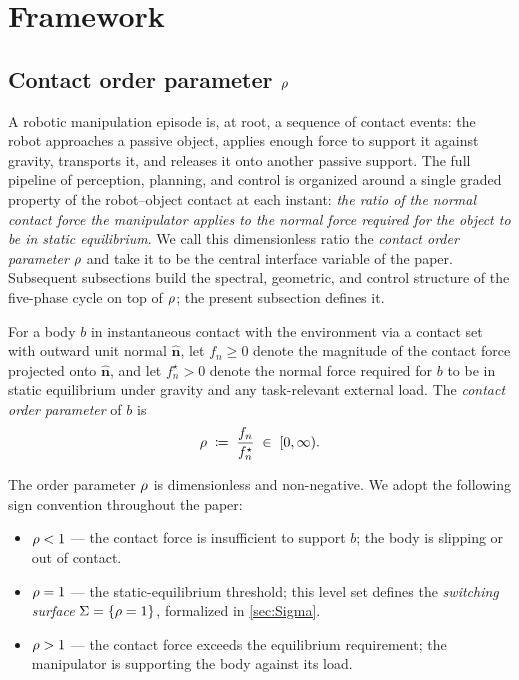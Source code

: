 \section{Framework}
\label{sec:framework}

\subsection{Contact order parameter $\rho$}
\label{sec:rho}

A robotic manipulation episode is, at root, a sequence of contact
events: the robot approaches a passive object, applies enough force
to support it against gravity, transports it, and releases it onto
another passive support. The full pipeline of perception, planning,
and control is organized around a single graded property of the
robot--object contact at each instant: \emph{the ratio of the
normal contact force the manipulator applies to the normal force
required for the object to be in static equilibrium}. We call
this dimensionless ratio the \emph{contact order parameter}
$\rho$ and take it to be the central interface variable of
the paper. Subsequent subsections
build the spectral, geometric, and control structure of the
five-phase cycle on top of $\rho$; the present subsection
defines it.

\begin{definition}
\label{def:rho}
For a body $b$ in instantaneous contact with the environment via a
contact set with outward unit normal $\hat{\mathbf n}$, let
$f_{n} \ge 0$ denote the magnitude of the contact force projected
onto $\hat{\mathbf n}$, and let $f_{n}^{\star} > 0$ denote the
normal force required for $b$ to be in static equilibrium under
gravity and any task-relevant external load. The
\emph{contact order parameter} of $b$ is
\begin{equation}
\label{eq:rho-def}
\rho \;\coloneqq\; \frac{f_{n}}{f_{n}^{\star}} \;\in\; [0, \infty).
\end{equation}
\end{definition}

The order parameter $\rho$ is dimensionless and non-negative.
We adopt the following sign convention throughout the paper:
\begin{itemize}[leftmargin=*]
  \item $\rho < 1$ --- the contact force is insufficient to
    support $b$; the body is slipping or out of contact.
  \item $\rho = 1$ --- the static-equilibrium threshold; this
    level set defines the \emph{switching surface}
    $\Sigma = \{\rho = 1\}$, formalized in \cref{sec:Sigma}.
  \item $\rho > 1$ --- the contact force exceeds the
    equilibrium requirement; the manipulator is supporting the
    body against its load.
\end{itemize}

